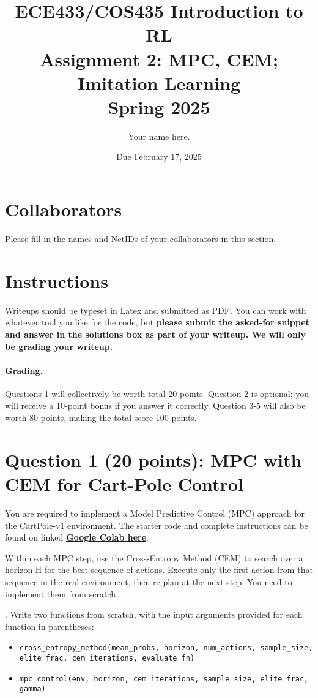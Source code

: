 \documentclass{article}
\date{Due February 17, 2025}
\author{\begin{fillme}[width=0.3\textwidth]
 Your name here.
\end{fillme}} %
\title{ECE433/COS435 Introduction to RL\\
  Assignment 2: MPC, CEM; Imitation Learning\\
  Spring 2025\\
}
\begin{document}
    \maketitle
    \section*{Collaborators}
    \begin{fillme}
     Please fill in the names and NetIDs of your collaborators in this section.
    \end{fillme}

    \section*{Instructions}
    Writeups should be typeset in Latex and submitted as PDF. You can work with whatever tool you like for the code, but \textbf{please submit the asked-for snippet and answer in the solutions box as part of your writeup. We will only be grading your writeup.}
    
    \paragraph{Grading.} 
    Questions 1 will collectively be worth total 20 points. Question 2 is optional; you will receive a 10-point bonus if you answer it correctly. Question 3-5 will also be worth 80 points, making the total score 100 points.

    \clearpage

\section*{Question 1 (20 points): MPC with CEM for Cart-Pole Control}
You are required to implement a Model Predictive Control (MPC) approach for the CartPole-v1 environment. The starter code and complete instructions can be found on linked \href{https://colab.research.google.com/drive/1imnNUnqt-unv2MzHpaQBUlP5kFMWdnfI?usp=sharing}{\textbf{Google Colab here}}. 

Within each MPC step, use the Cross-Entropy Method (CEM) to search over a horizon H for the best sequence of actions. Execute only the first action from that sequence in the real environment, then re-plan at the next step. You need to implement them from scratch.

. Write two functions from scratch, with the input arguments provided for each function in parentheses:
\begin{itemize}
    \item \texttt{cross\_entropy\_method(mean\_probs, horizon, num\_actions, sample\_size, elite\_frac, cem\_iterations, evaluate\_fn)}
    \item \texttt{mpc\_control(env, horizon, cem\_iterations, sample\_size, elite\_frac, gamma)}
\end{itemize}
\end{document}
